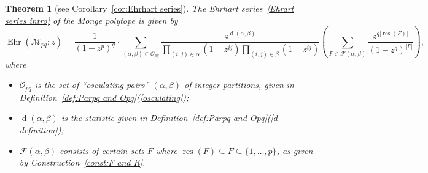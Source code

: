 \documentclass[noamsfonts,10pt]{amsart}
\newcommand{\M}{\mathcal{M}}
\newcommand{\al}{\alpha}
\newcommand{\be}{\beta}
\renewcommand{\O}{\mathcal{O}}
\newcommand{\F}{\mathcal{F}}
\renewcommand{\d}{\operatorname{d}}
\DeclareMathOperator{\Ehr}{Ehr}
\newcommand{\res}{\operatorname{res}}
\newcommand{\1}{\mathbf{1}}
\theoremstyle{plain}
\newtheorem{maintheorem}{Theorem}
\theoremstyle{definition}
\numberwithin{equation}{section}
\begin{document}
\begin{maintheorem}[see Corollary~\ref{cor:Ehrhart series}]
    \label{thm:Ehrhart in intro}
    The Ehrhart series~\eqref{Ehrart series intro} of the Monge polytope is given by
    \[
    \Ehr(\M_{pq}; z) =
    \frac{1}{(1-z^p)^q} \cdot 
    \sum_{(\al, \be) \in \O_{pq}} \frac{z^{\d(\al, \be)} }{\prod_{(i,j) \in \al} (1-z^{ij}) \prod_{(i,j) \in \be} (1-z^{ij})} 
    \left( 
    \sum_{F \in \F(\al,\be)} \frac{z^{q \left| \res(F) \right|} }{ (1-z^q)^{|F|}} \right),
    \]
    where
    \begin{itemize}
        \item[] $\O_{pq}$ is the set of ``osculating pairs'' $(\al,\be)$ of integer partitions, given in Definition~\ref{def:Parpq and Opq}(\ref{osculating});
        \item[] $\d( \al, \be)$ is the statistic given in Definition~\ref{def:Parpq and Opq}(\ref{d definition});
        \item[] $\F(\al,\be)$ consists of certain sets $F$ where $\res(F) \subseteq F \subseteq \{1, \ldots, p\}$, as given by Construction~\ref{const:F and R}.
    \end{itemize}
\end{maintheorem}
\end{document}
